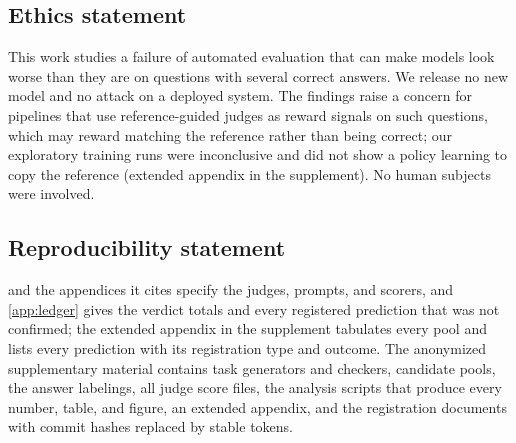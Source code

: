\documentclass{article}
\begin{document}
\subsection*{Ethics statement}
This work studies a failure of automated evaluation that can make models look worse than they are on questions with several correct answers. We release no new model and no attack on a deployed system. The findings raise a concern for pipelines that use reference-guided judges as reward signals on such questions, which may reward matching the reference rather than being correct; our exploratory training runs were inconclusive and did not show a policy learning to copy the reference (extended appendix in the supplement). No human subjects were involved.

\subsection*{Reproducibility statement}
 and the appendices it cites specify the judges, prompts, and scorers, and \cref{app:ledger} gives the verdict totals and every registered prediction that was not confirmed; the extended appendix in the supplement tabulates every pool and lists every prediction with its registration type and outcome. The anonymized supplementary material contains task generators and checkers, candidate pools, the answer labelings, all judge score files, the analysis scripts that produce every number, table, and figure, an extended appendix, and the registration documents with commit hashes replaced by stable tokens.




\newpage
\appendix
{}

\end{document}
